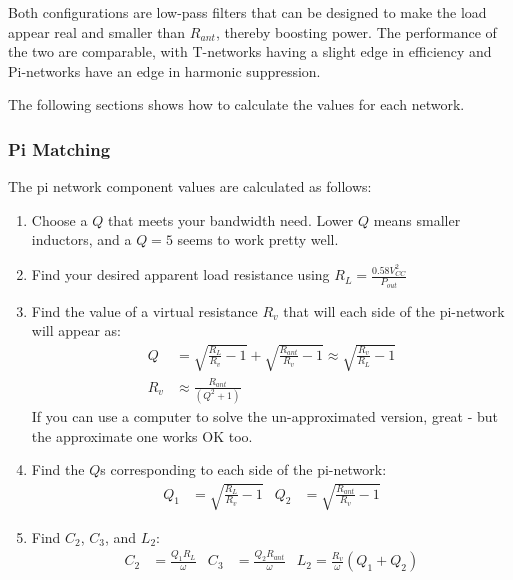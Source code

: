 \documentclass[10pt,letterpaper]{article}
\begin{document}
Both configurations are low-pass filters that can be designed to make the load appear real and smaller than $R_{ant}$, thereby boosting power. The performance of the two are comparable, with T-networks having a slight edge in efficiency and Pi-networks have an edge in harmonic suppression.

The following sections shows how to calculate the values for each network.

\subsubsection{Pi Matching}
The pi network component values are calculated as follows:
\begin{enumerate}
\item Choose a $Q$ that meets your bandwidth need. Lower $Q$ means smaller inductors, and a $Q=5$ seems to work pretty well.
\item Find your desired apparent load resistance using $R_L=\frac{0.58 V_{CC}^2}{P_{out}}$
\item Find the value of a virtual resistance $R_v$ that will each side of the pi-network will appear as:
\begin{align*}
Q&=\sqrt{\frac{R_L}{R_v}-1}+\sqrt{\frac{R_{ant}}{R_v}-1}\approx \sqrt{\frac{R_v}{R_L}-1}\\
R_v&\approx \frac{R_{ant}}{(Q^2+1)}
\end{align*}
If you can use a computer to solve the un-approximated version, great - but the approximate one works OK too.
\item Find the $Q$s corresponding to each side of the pi-network:
\begin{align*}
Q_1 & = \sqrt{\frac{R_L}{R_v}-1} &Q_2 &=\sqrt{\frac{R_{ant}}{R_v}-1}
\end{align*}
\item Find $C_2$, $C_3$, and $L_2$:
\begin{align*}
C_2 &= \frac{Q_1 R_L}{\omega } &C_3 &= \frac{Q_2 R_{ant}}{\omega } & L_2 = \frac{R_v}{\omega} (Q_1+Q_2)
\end{align*}
\end{enumerate}
\end{document}
